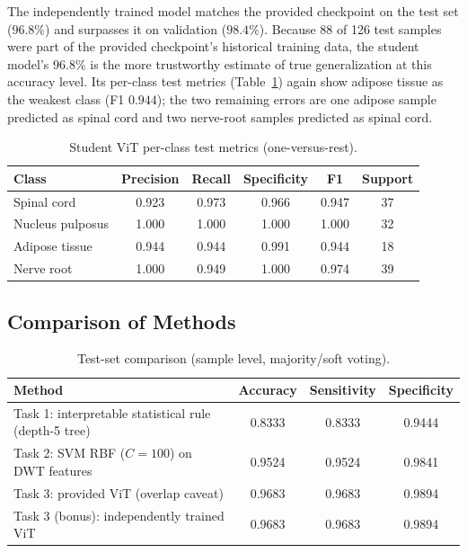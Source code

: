 \documentclass[11pt]{article}
\begin{document}
The independently trained model matches the provided checkpoint on the test
set ($96.8\%$) and surpasses it on validation ($98.4\%$). Because 88 of 126
test samples were part of the provided checkpoint's historical training data,
the student model's $96.8\%$ is the more trustworthy estimate of true
generalization at this accuracy level. Its per-class test metrics
(Table~\ref{tab:bonusper}) again show adipose tissue as the weakest class
(F1 $0.944$); the two remaining errors are one adipose sample predicted as
spinal cord and two nerve-root samples predicted as spinal cord.

\begin{table}[htbp]
\centering
\caption{Student ViT per-class test metrics (one-versus-rest).}
\label{tab:bonusper}
\small
\begin{tabular}{lccccc}
\toprule
Class & Precision & Recall & Specificity & F1 & Support\\
\midrule
Spinal cord & 0.923 & 0.973 & 0.966 & 0.947 & 37\\
Nucleus pulposus & 1.000 & 1.000 & 1.000 & 1.000 & 32\\
Adipose tissue & 0.944 & 0.944 & 0.991 & 0.944 & 18\\
Nerve root & 1.000 & 0.949 & 1.000 & 0.974 & 39\\
\bottomrule
\end{tabular}
\end{table}

\subsection{Comparison of Methods}
\label{sec:comp}

\begin{table}[htbp]
\centering
\caption{Test-set comparison (sample level, majority/soft voting).}
\label{tab:comp}
\small
\begin{tabular}{lccc}
\toprule
Method & Accuracy & Sensitivity & Specificity\\
\midrule
Task 1: interpretable statistical rule (depth-5 tree) & 0.8333 & 0.8333 & 0.9444\\
Task 2: SVM RBF ($C=100$) on DWT features & 0.9524 & 0.9524 & 0.9841\\
Task 3: provided ViT (overlap caveat) & 0.9683 & 0.9683 & 0.9894\\
Task 3 (bonus): independently trained ViT & 0.9683 & 0.9683 & 0.9894\\
\bottomrule
\end{tabular}
\end{table}
\end{document}

